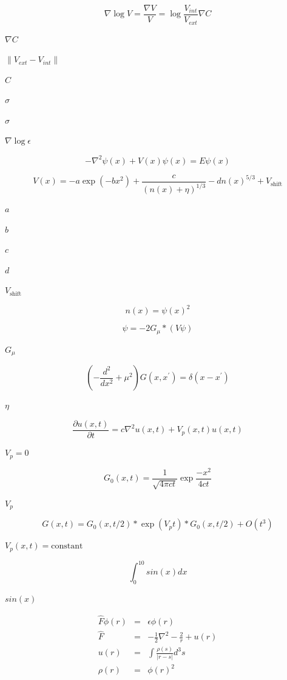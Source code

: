 \documentclass{article}
\begin{document}
\[ 
\nabla \log V = \frac{\nabla V}{V} = \log \frac{V_{int}}{V_{ext}} \nabla C
\]
\pagebreak

$ \nabla C $
\pagebreak

$ \| V_{ext} - V_{int} \| $
\pagebreak

$ C $
\pagebreak

$
\sigma $
\pagebreak

$ \sigma $
\pagebreak

$ \nabla \log \epsilon
$
\pagebreak

\[
-\nabla^2 \psi(x) + V(x) \psi(x) = E \psi(x)
\]
\pagebreak

\[
V(x) = -a \exp(-b x^2) + \frac{c}{(n(x)+\eta)^{1/3}} - d n(x)^{5/3} + V_{\mbox{shift}}
\]
\pagebreak

$ a $
\pagebreak

$ b $
\pagebreak

$ c $
\pagebreak

$ d $
\pagebreak

$ V_{\mbox{shift}} $
\pagebreak

\[
n(x) = \psi(x)^2
\]
\pagebreak

\[
   \psi = - 2 G_{\mu} * \left ( V \psi \right)
\]
\pagebreak

$ G_{\mu}$
\pagebreak

\[
   \left( - \frac{d^2}{dx^2} + \mu^2 \right) G(x,x^{\prime}) = \delta(x-x^{\prime})
\]
\pagebreak

$ \eta $
\pagebreak

\[
  \frac{\partial u(x,t)}{\partial t} = c \nabla^2 u(x,t) + V_p(x,t) u(x,t)
\]
\pagebreak

$ V_p = 0 $
\pagebreak

\[
  G_0(x,t) = \frac{1}{\sqrt{4 \pi c t}} \exp \frac{-x^2}{4 c t}
\]
\pagebreak

$ V_p $
\pagebreak

\[
  G(x,t) = G_0(x,t/2) * \exp(V_p t) * G_0(x,t/2) + O(t^3)
\]
\pagebreak

$ V_p(x,t)=\mbox{constant} $
\pagebreak

\[
   \int_0^{10} sin(x) dx
\]
\pagebreak

$ sin(x) $
\pagebreak

\begin{eqnarray*}
   \hat{F} \phi(r) &=& \epsilon \phi(r) \\
   \hat{F} &=& -\frac{1}{2} \nabla^2 - \frac{2}{r} + u(r) \\
   u(r) &=& \int \frac{\rho(s)}{| r - s |} d^3s \\
   \rho(r) &=& \phi(r)^2
\end{eqnarray*}
\pagebreak
\end{document}
